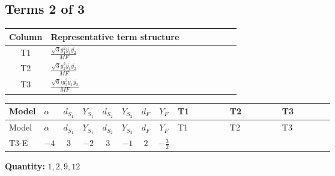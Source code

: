 \documentclass[8pt]{article}
\begin{document}
\begin{landscape}
\subsection*{Terms 2 of 3}
\begin{center}
\begin{tabular}{@{}c >{\raggedright\arraybackslash}p{0.82\linewidth}@{}}
\toprule
Column & Representative term structure \\
\midrule
T1 & \(\displaystyle \frac{\sqrt{3} g_{1}^{2} \overline{y_{1}} \overline{y_{2}}}{MF}\) \\
\midrule
T2 & \(\displaystyle \frac{\sqrt{3} g_{2}^{2} \overline{y_{1}} \overline{y_{2}}}{MF}\) \\
\midrule
T3 & \(\displaystyle \frac{\sqrt{6} i g_{2}^{2} \overline{y_{1}} \overline{y_{2}}}{MF}\) \\
\midrule
\bottomrule
\end{tabular}
\end{center}
\smallskip
\tiny
\begin{longtable}{@{}llcccccc >{\raggedright\arraybackslash}p{0.21\linewidth} >{\raggedright\arraybackslash}p{0.21\linewidth} >{\raggedright\arraybackslash}p{0.21\linewidth}@{}}
\toprule
Model & $\alpha$ & $d_{S_1}$ & $Y_{S_1}$ & $d_{S_2}$ & $Y_{S_2}$ & $d_F$ & $Y_F$ & T1 & T2 & T3 \\
\midrule
\endfirsthead
\toprule
Model & $\alpha$ & $d_{S_1}$ & $Y_{S_1}$ & $d_{S_2}$ & $Y_{S_2}$ & $d_F$ & $Y_F$ & T1 & T2 & T3 \\
\midrule
\endhead
T3-E & $-4$ & $3$ & $-2$ & $3$ & $-1$ & $2$ & $-\frac{3}{2}$ & \scriptsize\adjustbox{max width=\linewidth}{$\begin{gathered} \frac{9 \sqrt{3} g_{1}^{2} \overline{y_{1}} \overline{y_{2}}}{8 MF}\end{gathered}$} & \scriptsize\adjustbox{max width=\linewidth}{$\begin{gathered} \frac{15 \sqrt{3} g_{2}^{2} \overline{y_{1}} \overline{y_{2}}}{8 MF}\end{gathered}$} & \scriptsize\adjustbox{max width=\linewidth}{$\begin{gathered} - \frac{\sqrt{6} i g_{2}^{2} \overline{y_{1}} \overline{y_{2}}}{6 MF}\end{gathered}$} \\
\midrule
\bottomrule
\end{longtable}
\clearpage
\noindent\textbf{Quantity: }$\mathrm{1,2,9,12}$\par\smallskip

\end{landscape}
\end{document}
